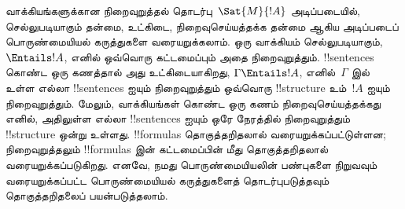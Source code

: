 \documentclass[../../../include/open-logic-section]{subfiles}
\begin{document}
வாக்கியங்களுக்கான நிறைவுறுத்தல் தொடர்பு~$\Sat{M}{!A}$ அடிப்படையில்,
செல்லுபடியாகும் தன்மை, உட்கிடை, நிறைவுசெய்யத்தக்க தன்மை ஆகிய அடிப்படைப்
பொருண்மையியல் கருத்துகளை வரையறுக்கலாம். ஒரு வாக்கியம் செல்லுபடியாகும்,
$\Entails !A$, எனில் ஒவ்வொரு கட்டமைப்பும் அதை நிறைவுறுத்தும்.
!!{sentence}s கொண்ட ஒரு கணத்தால் அது உட்கிடையாகிறது,
$\Gamma \Entails !A$, எனில்~$\Gamma$ இல் உள்ள எல்லா !!{sentence}s ஐயும்
நிறைவுறுத்தும் ஒவ்வொரு !!{structure} உம்~$!A$ ஐயும் நிறைவுறுத்தும்.
மேலும், வாக்கியங்கள் கொண்ட ஒரு கணம் நிறைவுசெய்யத்தக்கது எனில், அதிலுள்ள
எல்லா !!{sentence}s ஐயும் ஒரே நேரத்தில் நிறைவுறுத்தும் !!{structure} ஒன்று
உள்ளது. !!{formula}s தொகுத்தறிதலால் வரையறுக்கப்பட்டுள்ளன; நிறைவுறுத்தலும்
!!{formula}s இன் கட்டமைப்பின் மீது தொகுத்தறிதலால் வரையறுக்கப்படுகிறது.
எனவே, நமது பொருண்மையியலின் பண்புகளை நிறுவவும் வரையறுக்கப்பட்ட
பொருண்மையியல் கருத்துகளைத் தொடர்புபடுத்தவும் தொகுத்தறிதலைப் பயன்படுத்தலாம்.
\end{document}
